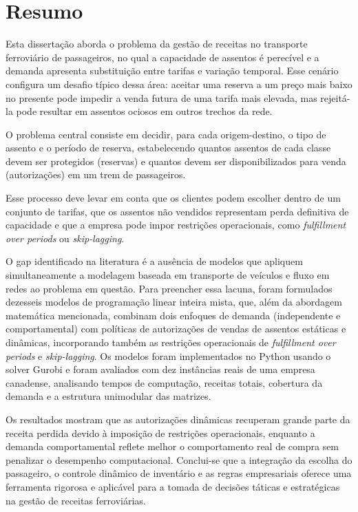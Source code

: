 \chapter*{Resumo}

\vspace{-1.0cm}

	Esta dissertação aborda o problema da gestão de receitas no transporte ferroviário de passageiros, no qual a capacidade de assentos é perecível e a demanda apresenta substituição entre tarifas e variação temporal. Esse cenário configura um desafio típico dessa área: aceitar uma reserva a um preço mais baixo no presente pode impedir a venda futura de uma tarifa mais elevada, mas rejeitá-la pode resultar em assentos ociosos em outros trechos da rede.
	
	O problema central consiste em decidir, para cada origem-destino, o tipo de assento e o período de reserva, estabelecendo quantos assentos de cada classe devem ser protegidos (reservas) e quantos devem ser disponibilizados para venda (autorizações) em um trem de passageiros.

	Esse processo deve levar em conta que os clientes podem escolher dentro de um conjunto de tarifas, que os assentos não vendidos representam perda definitiva de capacidade e que a empresa pode impor restrições operacionais, como \textit{fulfillment over periods} ou \textit{skip-lagging}.

	O gap identificado na literatura é a ausência de modelos que apliquem simultaneamente a modelagem baseada em transporte de veículos e fluxo em redes ao problema em questão. Para preencher essa lacuna, foram formulados dezesseis modelos de programação linear inteira mista, que, além da abordagem matemática mencionada, combinam dois enfoques de demanda (independente e comportamental) com políticas de autorizações de vendas de assentos estáticas e dinâmicas, incorporando também as restrições operacionais de \textit{fulfillment over periods} e \textit{skip-lagging}. Os modelos foram implementados no Python usando o solver Gurobi e foram avaliados com dez instâncias reais de uma empresa canadense, analisando tempos de computação, receitas totais, cobertura da demanda e a estrutura unimodular das matrizes.

	Os resultados mostram que as autorizações dinâmicas recuperam grande parte da receita perdida devido à imposição de restrições operacionais, enquanto a demanda comportamental reflete melhor o comportamento real de compra sem penalizar o desempenho computacional. Conclui-se que a integração da escolha do passageiro, o controle dinâmico de inventário e as regras empresariais oferece uma ferramenta rigorosa e aplicável para a tomada de decisões táticas e estratégicas na gestão de receitas ferroviárias.



